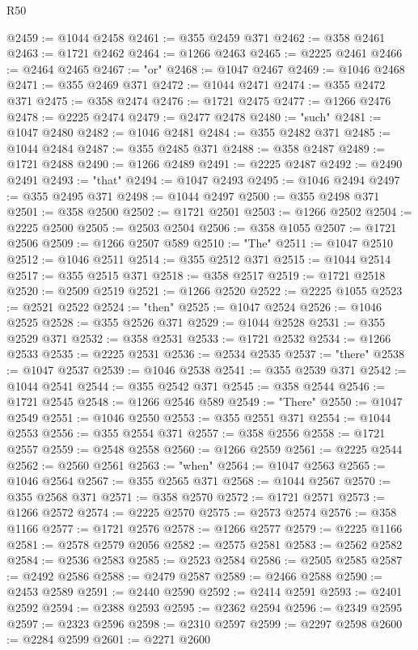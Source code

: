 \begin{lexlean}{R50}
\begin{coremodule}
@2459 := @1044 @2458
@2461 := @355 @2459 @371
@2462 := @358 @2461
@2463 := @1721 @2462
@2464 := @1266 @2463
@2465 := @2225 @2461
@2466 := @2464 @2465
@2467 := "or"
@2468 := @1047 @2467
@2469 := @1046 @2468
@2471 := @355 @2469 @371
@2472 := @1044 @2471
@2474 := @355 @2472 @371
@2475 := @358 @2474
@2476 := @1721 @2475
@2477 := @1266 @2476
@2478 := @2225 @2474
@2479 := @2477 @2478
@2480 := "such"
@2481 := @1047 @2480
@2482 := @1046 @2481
@2484 := @355 @2482 @371
@2485 := @1044 @2484
@2487 := @355 @2485 @371
@2488 := @358 @2487
@2489 := @1721 @2488
@2490 := @1266 @2489
@2491 := @2225 @2487
@2492 := @2490 @2491
@2493 := "that"
@2494 := @1047 @2493
@2495 := @1046 @2494
@2497 := @355 @2495 @371
@2498 := @1044 @2497
@2500 := @355 @2498 @371
@2501 := @358 @2500
@2502 := @1721 @2501
@2503 := @1266 @2502
@2504 := @2225 @2500
@2505 := @2503 @2504
@2506 := @358 @1055
@2507 := @1721 @2506
@2509 := @1266 @2507 @589
@2510 := "The"
@2511 := @1047 @2510
@2512 := @1046 @2511
@2514 := @355 @2512 @371
@2515 := @1044 @2514
@2517 := @355 @2515 @371
@2518 := @358 @2517
@2519 := @1721 @2518
@2520 := @2509 @2519
@2521 := @1266 @2520
@2522 := @2225 @1055
@2523 := @2521 @2522
@2524 := "then"
@2525 := @1047 @2524
@2526 := @1046 @2525
@2528 := @355 @2526 @371
@2529 := @1044 @2528
@2531 := @355 @2529 @371
@2532 := @358 @2531
@2533 := @1721 @2532
@2534 := @1266 @2533
@2535 := @2225 @2531
@2536 := @2534 @2535
@2537 := "there"
@2538 := @1047 @2537
@2539 := @1046 @2538
@2541 := @355 @2539 @371
@2542 := @1044 @2541
@2544 := @355 @2542 @371
@2545 := @358 @2544
@2546 := @1721 @2545
@2548 := @1266 @2546 @589
@2549 := "There"
@2550 := @1047 @2549
@2551 := @1046 @2550
@2553 := @355 @2551 @371
@2554 := @1044 @2553
@2556 := @355 @2554 @371
@2557 := @358 @2556
@2558 := @1721 @2557
@2559 := @2548 @2558
@2560 := @1266 @2559
@2561 := @2225 @2544
@2562 := @2560 @2561
@2563 := "when"
@2564 := @1047 @2563
@2565 := @1046 @2564
@2567 := @355 @2565 @371
@2568 := @1044 @2567
@2570 := @355 @2568 @371
@2571 := @358 @2570
@2572 := @1721 @2571
@2573 := @1266 @2572
@2574 := @2225 @2570
@2575 := @2573 @2574
@2576 := @358 @1166
@2577 := @1721 @2576
@2578 := @1266 @2577
@2579 := @2225 @1166
@2581 := @2578 @2579 @2056
@2582 := @2575 @2581
@2583 := @2562 @2582
@2584 := @2536 @2583
@2585 := @2523 @2584
@2586 := @2505 @2585
@2587 := @2492 @2586
@2588 := @2479 @2587
@2589 := @2466 @2588
@2590 := @2453 @2589
@2591 := @2440 @2590
@2592 := @2414 @2591
@2593 := @2401 @2592
@2594 := @2388 @2593
@2595 := @2362 @2594
@2596 := @2349 @2595
@2597 := @2323 @2596
@2598 := @2310 @2597
@2599 := @2297 @2598
@2600 := @2284 @2599
@2601 := @2271 @2600

\end{coremodule}
\end{lexlean}
